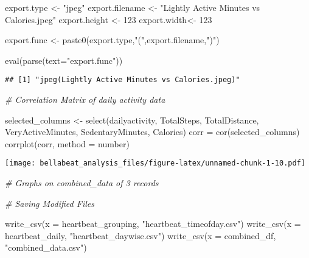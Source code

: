 \documentclass[
]{article}
\newenvironment{Shaded}{\begin{snugshade}}{\end{snugshade}}
\newcommand{\AttributeTok}[1]{\textcolor[rgb]{0.77,0.63,0.00}{#1}}
\newcommand{\CommentTok}[1]{\textcolor[rgb]{0.56,0.35,0.01}{\textit{#1}}}
\newcommand{\DecValTok}[1]{\textcolor[rgb]{0.00,0.00,0.81}{#1}}
\newcommand{\FunctionTok}[1]{\textcolor[rgb]{0.00,0.00,0.00}{#1}}
\newcommand{\NormalTok}[1]{#1}
\newcommand{\OtherTok}[1]{\textcolor[rgb]{0.56,0.35,0.01}{#1}}
\newcommand{\StringTok}[1]{\textcolor[rgb]{0.31,0.60,0.02}{#1}}
\begin{document}
\begin{Shaded}
\begin{Highlighting}[]
\NormalTok{export.type }\OtherTok{\textless{}{-}} \StringTok{"jpeg"}
\NormalTok{export.filename }\OtherTok{\textless{}{-}} \StringTok{"Lightly Active Minutes vs Calories.jpeg"}
\NormalTok{export.height }\OtherTok{\textless{}{-}} \DecValTok{123}
\NormalTok{export.width}\OtherTok{\textless{}{-}} \DecValTok{123}

\NormalTok{export.func }\OtherTok{\textless{}{-}} \FunctionTok{paste0}\NormalTok{(export.type,}\StringTok{"("}\NormalTok{,export.filename,}\StringTok{")"}\NormalTok{)}

\FunctionTok{eval}\NormalTok{(}\FunctionTok{parse}\NormalTok{(}\AttributeTok{text=}\StringTok{"export.func"}\NormalTok{))}
\end{Highlighting}
\end{Shaded}

\begin{verbatim}
## [1] "jpeg(Lightly Active Minutes vs Calories.jpeg)"
\end{verbatim}

\begin{Shaded}
\begin{Highlighting}[]
\CommentTok{\# Correlation Matrix of daily activity data}

\NormalTok{selected\_columns }\OtherTok{\textless{}{-}} \FunctionTok{select}\NormalTok{(dailyactivity, TotalSteps, TotalDistance, VeryActiveMinutes, SedentaryMinutes, Calories)}
\NormalTok{corr }\OtherTok{=} \FunctionTok{cor}\NormalTok{(selected\_columns)}
\FunctionTok{corrplot}\NormalTok{(corr, }\AttributeTok{method =} \StringTok{\textquotesingle{}number\textquotesingle{}}\NormalTok{)}
\end{Highlighting}
\end{Shaded}

\texttt{[image: bellabeat\_analysis\_files/figure-latex/unnamed-chunk-1-10.pdf]}

\begin{Shaded}
\begin{Highlighting}[]
\CommentTok{\# Graphs on combined\_data of 3 records}

\CommentTok{\# Saving Modified Files}

\FunctionTok{write\_csv}\NormalTok{(}\AttributeTok{x =}\NormalTok{ heartbeat\_grouping, }\StringTok{"heartbeat\_timeofday.csv"}\NormalTok{)}
\FunctionTok{write\_csv}\NormalTok{(}\AttributeTok{x =}\NormalTok{ heartbeat\_daily, }\StringTok{"heartbeat\_daywise.csv"}\NormalTok{)}
\FunctionTok{write\_csv}\NormalTok{(}\AttributeTok{x =}\NormalTok{ combined\_df, }\StringTok{"combined\_data.csv"}\NormalTok{)}
\end{Highlighting}
\end{Shaded}
\end{document}
